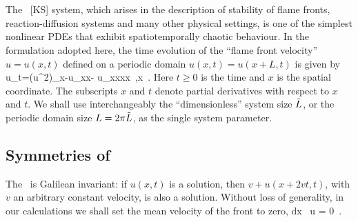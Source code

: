 

\section{\KSe}
\label{s-KS}


The \KS\ [KS] system, which
arises in the description of stability of
flame fronts, reaction-diffusion systems and many other physical settings,
is one of the simplest nonlinear PDEs that
exhibit spatiotemporally chaotic behaviour.
In the formulation adopted here, the time evolution of the 
``flame front velocity'' $u=u(x,t)$ defined on a periodic domain
$u(x,t) = u(x+L,t)$
is given by
\beq
    u_t=(u^2)_x-u_{xx}- u_{xxxx}
    \,,\qquad   x \in [0,2\pi \tildeL]
    \,.
Here $t \geq 0$ is the time and
$x$ is the spatial coordinate.
The subscripts $x$ and $t$ denote partial derivatives with respect to
$x$ and $t$. We shall use interchangeably the ``dimensionless''
system size $\tilde{L}$, or the periodic domain size $L= 2\pi \tilde{L}$,
as the single system parameter.


\subsection{Symmetries of \KSe}

The  \KSe\ is
Galilean invariant: if $u(x,t)$ is a solution, then 
$v+u(x+2vt,t)$, with $v$ an arbitrary constant velocity, is also a solution. 
Without loss of generality, in our calculations we shall set 
the mean velocity of the  front to zero,
\beq
\int dx \, u = 0
\,.


